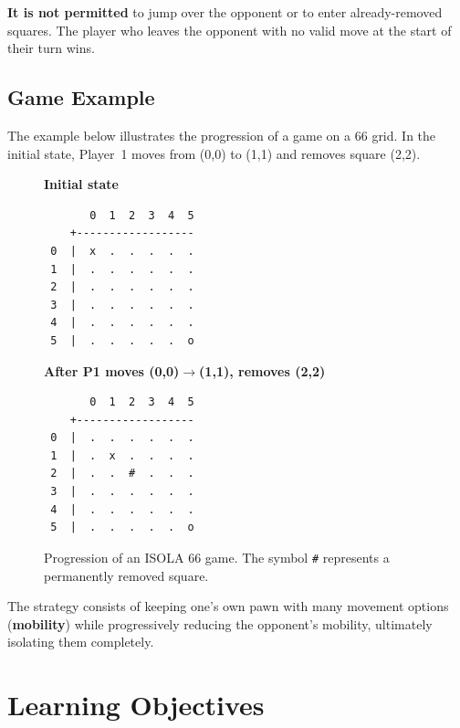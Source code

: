 \textbf{It is not permitted} to jump over the opponent or to enter
already-removed squares. The player who leaves the opponent with no
valid move at the start of their turn wins.

\subsection{Game Example}
\label{subsec:example}

The example below illustrates the progression of a game on a 6{\texttimes}6 grid.
In the initial state, Player~1 moves from (0,0) to (1,1) and removes
square (2,2).

\begin{figure}[htbp]
  \centering
  \begin{minipage}[t]{0.45\textwidth}
    \centering
    \textbf{Initial state}
    \begin{verbatim}
       0  1  2  3  4  5
    +------------------
 0  |  x  .  .  .  .  .
 1  |  .  .  .  .  .  .
 2  |  .  .  .  .  .  .
 3  |  .  .  .  .  .  .
 4  |  .  .  .  .  .  .
 5  |  .  .  .  .  .  o
    \end{verbatim}
  \end{minipage}
  \hfill
  \begin{minipage}[t]{0.45\textwidth}
    \centering
    \textbf{After P1 moves (0,0)$\to$(1,1), removes (2,2)}
    \begin{verbatim}
       0  1  2  3  4  5
    +------------------
 0  |  .  .  .  .  .  .
 1  |  .  x  .  .  .  .
 2  |  .  .  #  .  .  .
 3  |  .  .  .  .  .  .
 4  |  .  .  .  .  .  .
 5  |  .  .  .  .  .  o
    \end{verbatim}
  \end{minipage}
  \caption{Progression of an ISOLA 6{\texttimes}6 game.
           The symbol \texttt{\#} represents a permanently removed square.}
  \label{fig:game_example}
\end{figure}

The strategy consists of keeping one's own pawn with many movement options
(\textbf{mobility}) while progressively reducing the opponent's mobility,
ultimately isolating them completely.


\section{Learning Objectives}
\label{sec:objectives}

